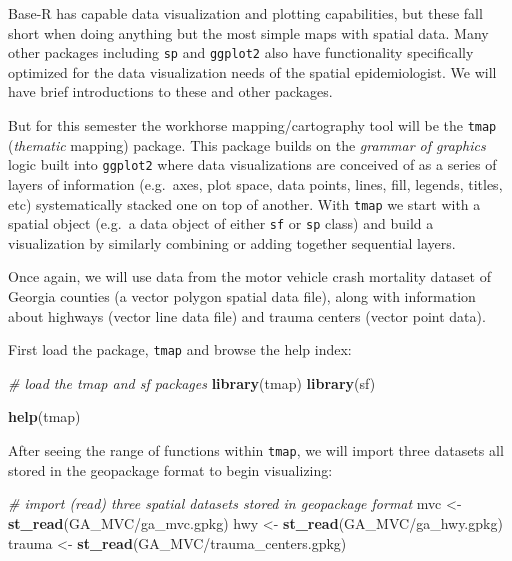 \documentclass[
]{book}
\newenvironment{Shaded}{\begin{snugshade}}{\end{snugshade}}
\newcommand{\CommentTok}[1]{\textcolor[rgb]{0.56,0.35,0.01}{\textit{#1}}}
\newcommand{\FunctionTok}[1]{\textcolor[rgb]{0.13,0.29,0.53}{\textbf{#1}}}
\newcommand{\NormalTok}[1]{#1}
\newcommand{\OtherTok}[1]{\textcolor[rgb]{0.56,0.35,0.01}{#1}}
\newcommand{\StringTok}[1]{\textcolor[rgb]{0.31,0.60,0.02}{#1}}
\begin{document}
Base-R has capable data visualization and plotting capabilities, but these fall short when doing anything but the most simple maps with spatial data. Many other packages including \texttt{sp} and \texttt{ggplot2} also have functionality specifically optimized for the data visualization needs of the spatial epidemiologist. We will have brief introductions to these and other packages.

But for this semester the workhorse mapping/cartography tool will be the \texttt{tmap} (\emph{thematic} mapping) package. This package builds on the \emph{grammar of graphics} logic built into \texttt{ggplot2} where data visualizations are conceived of as a series of layers of information (e.g.~axes, plot space, data points, lines, fill, legends, titles, etc) systematically stacked one on top of another. With \texttt{tmap} we start with a spatial object (e.g.~a data object of either \texttt{sf} or \texttt{sp} class) and build a visualization by similarly combining or adding together sequential layers.

Once again, we will use data from the motor vehicle crash mortality dataset of Georgia counties (a vector polygon spatial data file), along with information about highways (vector line data file) and trauma centers (vector point data).

First load the package, \texttt{tmap} and browse the help index:

\begin{Shaded}
\begin{Highlighting}[]
\CommentTok{\# load the tmap and sf packages}
\FunctionTok{library}\NormalTok{(tmap)}
\FunctionTok{library}\NormalTok{(sf)}

\FunctionTok{help}\NormalTok{(}\StringTok{\textquotesingle{}tmap\textquotesingle{}}\NormalTok{)}
\end{Highlighting}
\end{Shaded}

After seeing the range of functions within \texttt{tmap}, we will import three datasets all stored in the geopackage format to begin visualizing:

\begin{Shaded}
\begin{Highlighting}[]
\CommentTok{\# import (read) three spatial datasets stored in geopackage format}
\NormalTok{mvc }\OtherTok{\textless{}{-}} \FunctionTok{st\_read}\NormalTok{(}\StringTok{\textquotesingle{}GA\_MVC/ga\_mvc.gpkg\textquotesingle{}}\NormalTok{)}
\NormalTok{hwy }\OtherTok{\textless{}{-}} \FunctionTok{st\_read}\NormalTok{(}\StringTok{\textquotesingle{}GA\_MVC/ga\_hwy.gpkg\textquotesingle{}}\NormalTok{)}
\NormalTok{trauma }\OtherTok{\textless{}{-}} \FunctionTok{st\_read}\NormalTok{(}\StringTok{\textquotesingle{}GA\_MVC/trauma\_centers.gpkg\textquotesingle{}}\NormalTok{)}
\end{Highlighting}
\end{Shaded}
\end{document}
